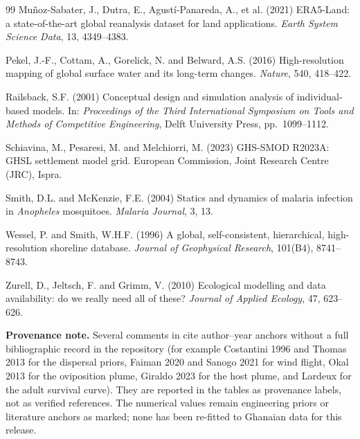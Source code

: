 \documentclass[11pt,a4paper]{article}
\newcommand{\code}[1]{\path{#1}}
\begin{document}
\begin{thebibliography}{99}
Mu\~noz-Sabater, J., Dutra, E., Agust\'i-Panareda, A., et al. (2021)
ERA5-Land: a state-of-the-art global reanalysis dataset for land
applications.
\emph{Earth System Science Data}, 13, 4349--4383.

Pekel, J.-F., Cottam, A., Gorelick, N. and Belward, A.S. (2016)
High-resolution mapping of global surface water and its long-term changes.
\emph{Nature}, 540, 418--422.

Railsback, S.F. (2001)
Conceptual design and simulation analysis of individual-based models.
In: \emph{Proceedings of the Third International Symposium on Tools and
Methods of Competitive Engineering}, Delft University Press, pp.~1099--1112.

Schiavina, M., Pesaresi, M. and Melchiorri, M. (2023)
GHS-SMOD R2023A: GHSL settlement model grid.
European Commission, Joint Research Centre (JRC), Ispra.

Smith, D.L. and McKenzie, F.E. (2004)
Statics and dynamics of malaria infection in \emph{Anopheles} mosquitoes.
\emph{Malaria Journal}, 3, 13.

Wessel, P. and Smith, W.H.F. (1996)
A global, self-consistent, hierarchical, high-resolution shoreline database.
\emph{Journal of Geophysical Research}, 101(B4), 8741--8743.

Zurell, D., Jeltsch, F. and Grimm, V. (2010)
Ecological modelling and data availability: do we really need all of these?
\emph{Journal of Applied Ecology}, 47, 623--626.

\end{thebibliography}

\vspace{1em}
\noindent\footnotesize
\textbf{Provenance note.} Several comments in
\code{model_constants.yaml} cite author--year anchors without a full
bibliographic record in the repository (for example Costantini 1996 and
Thomas 2013 for the dispersal priors, Faiman 2020 and Sanogo 2021 for wind
flight, Okal 2013 for the oviposition plume, Giraldo 2023 for the host
plume, and Lardeux for the adult survival curve). They are reported in
the tables as provenance labels, not as verified references. The numerical
values remain engineering priors or literature anchors as marked; none
has been re-fitted to Ghanaian data for this release.
\end{document}
